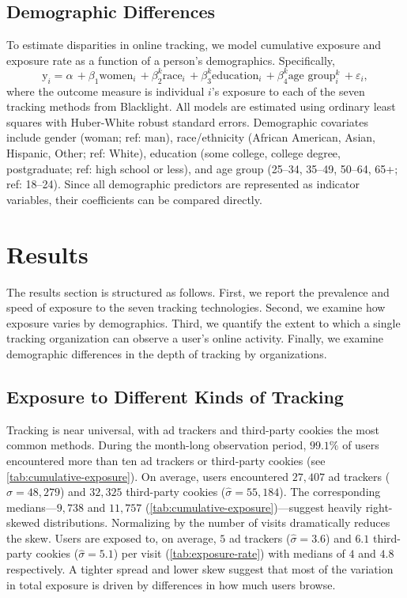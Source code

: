 \documentclass[12pt, letterpaper]{article}
\begin{document}
\subsection{Demographic Differences}\label{sec:demo_diff}
To estimate disparities in online tracking, we model cumulative exposure and exposure rate as a function of a person's demographics. Specifically, 
\begin{equation}\label{eq:demo-diff}
     \text{y}_i =
     \alpha
     \, + \beta_1   \text{women}_i
     \, + \beta_2^k \text{race}_i
     \, + \beta_3^k \text{education}_i
     \, + \beta_4^k \text{age group}_i^k
     \, + \varepsilon_i,
\end{equation}
where the outcome measure is individual $i$'s exposure to each of the seven tracking methods from Blacklight. All models are estimated using ordinary least squares with Huber-White robust standard errors. Demographic covariates include gender (woman; ref: man), race/ethnicity (African American, Asian, Hispanic, Other; ref: White), education (some college, college degree, postgraduate; ref: high school or less), and age group (25–34, 35–49, 50–64, 65+; ref: 18–24). Since all demographic predictors are represented as indicator variables, their coefficients can be compared directly.

\section{Results}
\label{sec:results}

The results section is structured as follows. First, we report the prevalence and speed of exposure to the seven tracking technologies. Second, we examine how exposure varies by demographics. Third, we quantify the extent to which a single tracking organization can observe a user's online activity. Finally, we examine demographic differences in the depth of tracking by organizations.

\subsection{Exposure to Different Kinds of Tracking}
\label{sec:prevalence_tracking}




Tracking is near universal, with ad trackers and third-party cookies the most common methods. During the month-long observation period, $99.1\%$ of users encountered more than ten ad trackers or third-party cookies  (see \cref{tab:cumulative-exposure}). On average, users encountered $27{,}407$ ad trackers ($\hat{\sigma} = 48{,}279$) and $32{,}325$ third-party cookies ($\hat{\sigma} = 55{,}184$). The corresponding medians---$9{,}738$ and $11{,}757$ (\cref{tab:cumulative-exposure})---suggest heavily right-skewed distributions. Normalizing by the number of visits dramatically reduces the skew. Users are exposed to, on average, $5$ ad trackers ($\hat{\sigma} = 3.6$) and $6.1$ third-party cookies ($\hat{\sigma} = 5.1$) per visit (\cref{tab:exposure-rate}) with medians of $4$ and $4.8$ respectively. A tighter spread and lower skew suggest that most of the variation in total exposure is driven by differences in how much users browse. 
\end{document}
